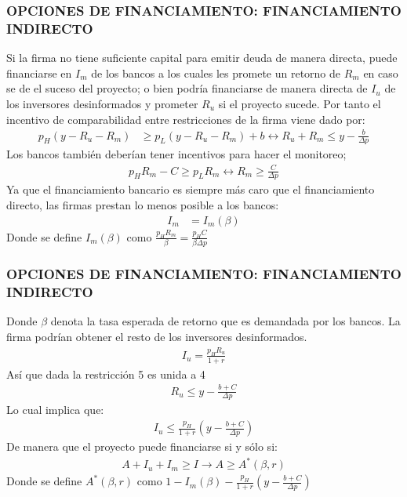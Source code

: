 \documentclass[10pt, xcolor=table, x11names]{beamer}
\begin{document}
\begin{frame}
    \frametitle{{\normalsize OPCIONES DE FINANCIAMIENTO: FINANCIAMIENTO INDIRECTO} {}}
    
   Si la firma no tiene suficiente capital para emitir deuda de manera directa, puede financiarse en $I_{m}$ de los bancos a los cuales les promete un retorno de $R_{m}$ en caso se de el suceso del proyecto; o bien podría financiarse de manera directa de $I_{u}$ de los inversores desinformados y prometer $R_{u}$ si el proyecto sucede. Por tanto el incentivo de comparabilidad entre restricciones de la firma viene dado por:
    \begin{align}
   p_{H}(y-R_{u}-R_{m})&\geq p_{L}(y-R_{u}-R_{m})+b\leftrightarrow R_{u}+R_{m}\leq y-\frac{b}{\Delta p} 
    \end{align}
    Los bancos también deberían tener incentivos para hacer el monitoreo;
     \begin{align}
    p_{H}R_{m}-C\geq p_{L}R_{m}\leftrightarrow R_{m}\geq \frac{C}{\Delta p}
    \end{align}
    Ya que el financiamiento bancario es siempre más caro que el financiamiento directo, las firmas prestan lo menos posible a los bancos:
     \begin{align}
    I_{m}&=I_{m}(\beta)
    \end{align}
    Donde se define $I_{m}(\beta)$ como $\frac{p_{H}R_{m}}{\beta}= \frac{p_{H}C}{\beta \Delta p}$
    
\end{frame}

\begin{frame}
    \frametitle{{\normalsize OPCIONES DE FINANCIAMIENTO: FINANCIAMIENTO INDIRECTO} {}}
       Donde $\beta$ denota la tasa esperada de retorno que es demandada por los bancos. La firma podrían obtener el resto de los inversores desinformados.
    \begin{align}
    I_{u}=\frac{p_{H}R_{u}}{1+r}
    \end{align}
    Así que dada la restricción 5 es unida a 4
     \begin{align}
     R_{u}\leq y-\frac{b+C}{\Delta p}
     \end{align}
    Lo cual implica que:
    \begin{align}
    I_{u}\leq\frac{p_{H}}{1+r}(y-\frac{b+C}{\Delta p})
    \end{align}
    De manera que el proyecto puede financiarse si y sólo si:
    \begin{align}
    A+I_{u}+I_{m}\geq I\rightarrow A\geq A^{*}(\beta, r)
    \end{align}
   Donde se define $A^{*}(\beta, r)$ como $1-I_{m}(\beta)-\frac{p_{H}}{1+r}(y-\frac{b+C}{\Delta p})$
   
\end{frame}
\end{document}
